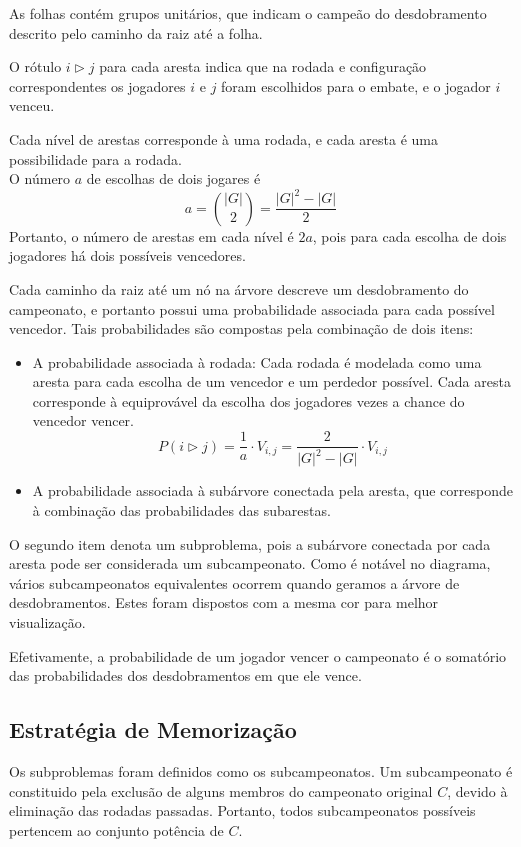 \documentclass{article}
\begin{document}
\noindent As folhas contém grupos unitários, que indicam o campeão do desdobramento descrito pelo caminho da raiz até a folha.

\noindent O rótulo $i \triangleright j$ para cada aresta indica que na rodada e configuração correspondentes os jogadores $i$ e $j$ foram escolhidos para o embate, e o jogador $i$ venceu.

\noindent Cada nível de arestas corresponde à uma rodada, e cada aresta é uma possibilidade para a rodada. \\
O número $a$ de escolhas de dois jogares é
\begin{equation} \label{eq:combinations}
  a = \binom{|G|}{2} = \frac{{|G|}^2 - |G|}{2}
\end{equation}
Portanto, o número de arestas em cada nível é $2a$, pois para cada escolha de dois jogadores há dois possíveis vencedores.

\pagebreak

\noindent Cada caminho da raiz até um nó na árvore descreve um desdobramento do campeonato, e portanto possui uma probabilidade associada para cada possível vencedor. Tais probabilidades são compostas pela combinação de dois itens:
\begin{itemize}
  \item A probabilidade associada à rodada: Cada rodada é modelada como uma aresta para cada escolha de um vencedor e um perdedor possível. Cada aresta corresponde à equiprovável da escolha dos jogadores vezes a chance do vencedor vencer.
    \[ P(i \triangleright j) = \frac{1}{a} \cdot V_{i,j} = \frac{2}{{|G|}^2 - |G|} \cdot V_{i,j} \]
  \item A probabilidade associada à subárvore conectada pela aresta, que corresponde à combinação das probabilidades das subarestas.
\end{itemize}

\noindent O segundo item denota um subproblema, pois a subárvore conectada por cada aresta pode ser considerada um subcampeonato. Como é notável no diagrama, vários subcampeonatos equivalentes ocorrem quando geramos a árvore de desdobramentos. Estes foram dispostos com a mesma cor para melhor visualização.

\noindent Efetivamente, a probabilidade de um jogador vencer o campeonato é o somatório das probabilidades dos desdobramentos em que ele vence.

\subsection{Estratégia de Memorização}
Os subproblemas foram definidos como os subcampeonatos. Um subcampeonato é constituido pela exclusão de alguns membros do campeonato original $C$, devido à eliminação das rodadas passadas. Portanto, todos subcampeonatos possíveis pertencem ao conjunto potência de $C$.
\end{document}

